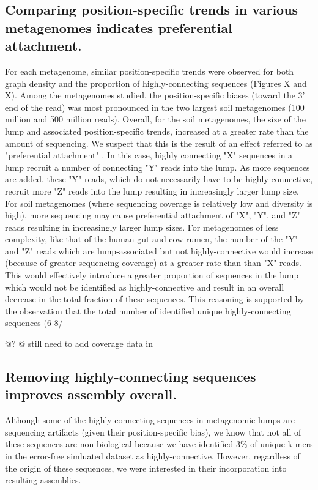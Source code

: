 \documentclass[11pt]{article} %
\begin{document}
\subsection{Comparing position-specific trends in various metagenomes indicates preferential attachment.}
For each metagenome, similar position-specific trends were observed for both graph density and the proportion of highly-connecting sequences (Figures X and X).  Among the metagenomes studied, the position-specific biases (toward the 3' end of the read) was most pronounced in the two largest soil metagenomes (100 million and 500 million reads).  Overall, for the soil metagenomes, the size of the lump and associated position-specific trends, increased at a greater rate than the amount of sequencing.  We suspect that this is the result of an effect referred to as "preferential attachment" \cite{Barabasi:1999p1083}. In this case, highly connecting "X" sequences in a lump recruit a number of connecting "Y" reads into the lump.  As more sequences are added, these "Y" reads, which do not necessarily have to be highly-connective, recruit more "Z" reads into the lump resulting in increasingly larger lump size.  For soil metagenomes (where sequencing coverage is relatively low and diversity is high), more sequencing may cause preferential attachment of "X", "Y", and "Z" reads resulting in increasingly larger lump sizes.  For metagenomes of less complexity, like that of the human gut and cow rumen, the number of the "Y" and "Z" reads which are lump-associated but not highly-connective would increase (because of greater sequencing coverage) at a greater rate than than "X" reads.   This would effectively introduce a greater proportion of sequences in the lump which would not be identified as highly-connective and result in an overall decrease in the total fraction of these sequences.   This reasoning is supported by the observation that the total number of identified unique highly-connecting sequences (6-8/%

@?
@ still need to add coverage data in

\subsection{Removing highly-connecting sequences improves assembly overall.}
Although some of the highly-connecting sequences in metagenomic lumps are sequencing artifacts (given their position-specific bias), we know that not all of these sequences are non-biological because we have identified 3\% of unique k-mers in the error-free simluated dataset as highly-connective.  However, regardless of the origin of these sequences, we were interested in their incorporation into resulting assemblies.
\end{document}
